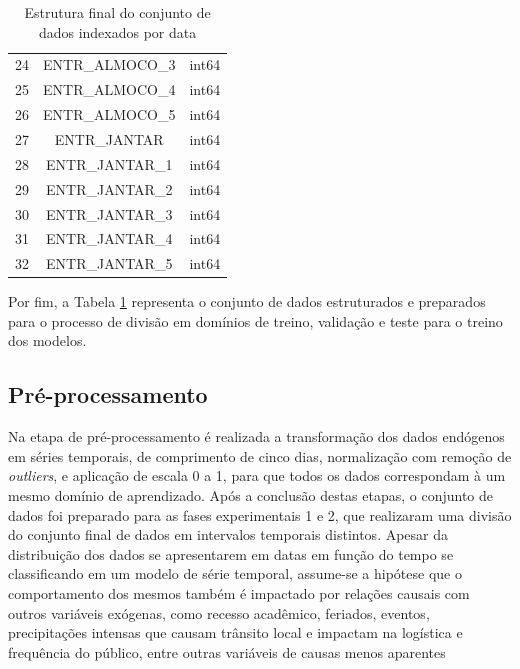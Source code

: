 \begin{table}[!ht]
\begin{tabular}{c|c|c}
                24&	ENTR\_ALMOCO\_3				&int64 \\ 
                25&	ENTR\_ALMOCO\_4				&int64 \\
                26&	ENTR\_ALMOCO\_5				&int64 \\
                27&	ENTR\_JANTAR				&	int64 \\ 
                28&	ENTR\_JANTAR\_1				&int64\\
                29&	ENTR\_JANTAR\_2				&int64 \\ 
                30&	ENTR\_JANTAR\_3				&int64 \\ 
                31&	ENTR\_JANTAR\_4				&int64 \\
                32&	ENTR\_JANTAR\_5				&int64\\
              \hline
            \end{tabular}
            \caption{Estrutura final do conjunto de dados indexados por data}
            \label{table:dataset_final}
        \end{table}
        Por fim, a Tabela \ref{table:dataset_final} representa o conjunto de dados estruturados e preparados para o processo de divisão em domínios de treino, validação e teste para o treino dos modelos.
        
	\subsection{Pré-processamento}
        Na etapa de pré-processamento é realizada a transformação dos dados endógenos em séries temporais, de comprimento de cinco dias, normalização com remoção de \textit{outliers}, e aplicação de escala 0 a 1, para que todos os dados correspondam à um mesmo domínio de aprendizado. Após a conclusão destas etapas, o conjunto de dados foi preparado para as fases experimentais 1 e 2, que realizaram uma divisão do conjunto final de dados em intervalos temporais distintos. Apesar da distribuição dos dados se apresentarem em datas em função do tempo se classificando em um modelo de série temporal, assume-se a hipótese que o comportamento dos mesmos também é impactado por relações causais com outros variáveis exógenas, como recesso acadêmico, feriados, eventos, precipitações intensas que causam trânsito local e impactam na logística e frequência do público, entre outras variáveis de causas menos aparentes
    
